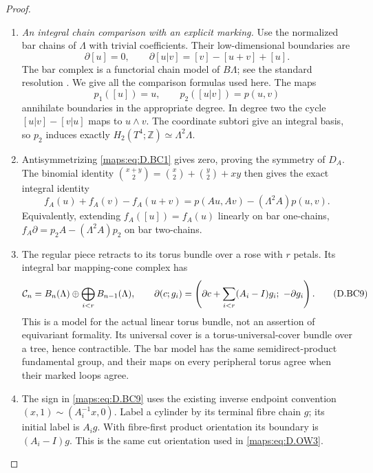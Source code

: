 \begin{proof}
\begin{enumerate}[label=\arabic*.,leftmargin=*]
\item \emph{An integral chain comparison with an explicit marking.}
Use the normalized bar chains of $\Lambda$ with
trivial coefficients. Their low-dimensional
boundaries are
\[
 \partial[u]=0,\qquad
 \partial[u|v]=[v]-[u+v]+[u].
                                                        \tag{D.BC6}\label{maps:eq:D.BC6}
\]
The bar complex is a functorial chain model of
$B\Lambda$; see the standard resolution
\cite[Chapter I, Section 5]{manBrown82}.
We give all the comparison formulas used here.
The maps
\[
             p_1([u])=u,\qquad p_2([u|v])=p(u,v)
                                                        \tag{D.BC7}\label{maps:eq:D.BC7}
\]
annihilate boundaries in the appropriate degree.
In degree two the cycle $[u|v]-[v|u]$ maps to
$u\wedge v$. The coordinate subtori give an
integral basis, so $p_2$ induces exactly
$H_2(T^4;\mathbb Z)\simeq\Lambda^2\Lambda$.

\item Antisymmetrizing \eqref{maps:eq:D.BC1} gives zero, proving
the symmetry of $D_A$. The binomial identity
$\binom{x+y}{2}=\binom{x}{2}+\binom{y}{2}+xy$
then gives the exact integral identity
\[
 f_A(u)+f_A(v)-f_A(u+v)
             =p(Au,Av)-(\Lambda^2A)p(u,v).
                                                        \tag{D.BC8}\label{maps:eq:D.BC8}
\]
Equivalently, extending $f_A([u])=f_A(u)$
linearly on bar one-chains,
$f_A\partial=p_2A-(\Lambda^2A)p_2$ on bar
two-chains.

\item The regular piece retracts to its torus bundle
over a rose with $r$ petals. Its integral bar
mapping-cone complex has
\[
 {\cal C}_n=B_n(\Lambda)\oplus
                   \bigoplus_{i<r}B_{n-1}(\Lambda),
 \qquad
 \partial(c;g_i)=
 \left(\partial c+\sum_{i<r}(A_i-I)g_i;\
                                     -\partial g_i\right).
                                                        \tag{D.BC9}\label{maps:eq:D.BC9}
\]
This is a model for the actual linear torus bundle,
not an assertion of equivariant formality. Its
universal cover is a torus-universal-cover bundle
over a tree, hence contractible. The bar model
has the same semidirect-product fundamental group,
and their maps on every peripheral torus agree
when their marked loops agree.

\item The sign in \eqref{maps:eq:D.BC9} uses the existing inverse
endpoint convention
$(x,1)\sim(A_i^{-1}x,0)$. Label a cylinder by its
terminal fibre chain $g$; its initial label is
$A_i g$. With fibre-first product orientation
its boundary is $(A_i-I)g$. This is the same cut
orientation used in \eqref{maps:eq:D.OW3}.


\end{enumerate}
\end{proof}
